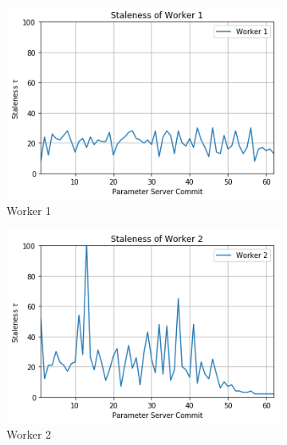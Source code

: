 \begin{figure}
  \centering
  \begin{subfigure}{.24\textwidth}
    \centering
    \includegraphics[width=\linewidth]{resources/images/plots/adag_agn_mnist/epoch_40/15/001/staleness/worker_1}
    \caption{Worker 1}
  \end{subfigure}
  \begin{subfigure}{.24\textwidth}
    \centering
    \includegraphics[width=\linewidth]{resources/images/plots/adag_agn_mnist/epoch_40/15/001/staleness/worker_2}
    \caption{Worker 2}
  \end{subfigure}
  \begin{subfigure}{.24\textwidth}
    \centering

\end{subfigure}
\end{figure}
